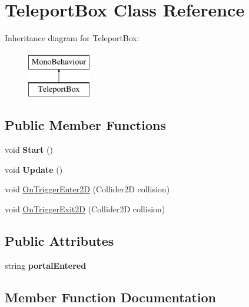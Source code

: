 \hypertarget{class_teleport_box}{}\section{Teleport\+Box Class Reference}
\label{class_teleport_box}
Inheritance diagram for Teleport\+Box\+:\begin{figure}[H]
\begin{center}
\leavevmode
\includegraphics[height=2.000000cm]{class_teleport_box}
\end{center}
\end{figure}
\subsection*{Public Member Functions}
\begin{DoxyCompactItemize}
\item 
\mbox{\label{class_teleport_box_a6e5afed61a3fae49c3e4cbf59845184f}} 
void {\bfseries Start} ()
\item 
\mbox{\label{class_teleport_box_ad4adb243e5c3307d1c2a634614e841de}} 
void {\bfseries Update} ()
\item 
void \mbox{\hyperlink{class_teleport_box_ae75f32edd3ec30c3badd96e6d4c6cf31}{On\+Trigger\+Enter2D}} (Collider2D collision)
\item 
void \mbox{\hyperlink{class_teleport_box_ae10220f96d834813b63acce959fc009d}{On\+Trigger\+Exit2D}} (Collider2D collision)
\end{DoxyCompactItemize}
\subsection*{Public Attributes}
\begin{DoxyCompactItemize}
\item 
\mbox{\label{class_teleport_box_aded6e64d463b8cac6fcc2727831c66ed}} 
string {\bfseries portal\+Entered}
\end{DoxyCompactItemize}


\subsection{Member Function Documentation}
\mbox{\label{class_teleport_box_ae75f32edd3ec30c3badd96e6d4c6cf31}} 
